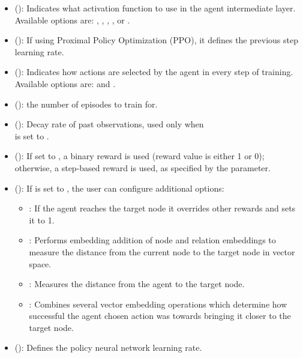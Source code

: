 \begin{itemize}
\item {}  (): Indicates what activation function to use in the agent intermediate layer. Available options are:  \cite{nair2010rectified}, \cite{maas2013rectifier},  \cite{he2015delving},    \cite{clevert2015fast}, or  \cite{lecun1998gradient}.
 
\item {} (): If using Proximal Policy Optimization (PPO), it defines the previous step learning rate.

\item {} (): Indicates how actions are selected by the agent in every step of training. Available options are:  and .

\item {} (): the number of episodes to train for.

\item {} (): Decay rate of past observations, used only when \\ is set to  .
 
\item {} (): If set to , a binary reward is used (reward value is either 1 or 0); otherwise, a step-based reward is used, as specified by the  parameter.  

\item {} (): If  is set to , the user can configure additional options:
    \begin{itemize}
        \item {}: If the agent reaches the target node it overrides other rewards and sets it to 1.
        \item {}: Performs embedding addition of node and relation embeddings to measure the distance from the current node to the target node in vector space.
        \item {}: Measures the distance from the agent to the target node.
        \item {}: Combines several vector embedding operations which determine how successful the agent chosen action was towards bringing it closer to the target node.
    \end{itemize}
\item {} (): Defines the policy neural network learning rate.


\end{itemize}
